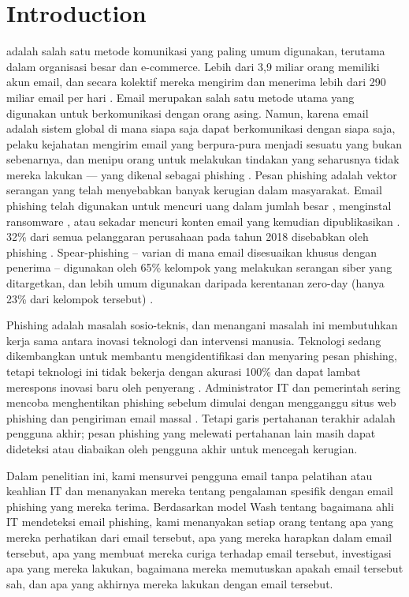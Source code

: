 \documentclass[lettersize,journal]{IEEEtran}
\begin{document}
\section{Introduction}
 adalah salah satu metode komunikasi yang paling umum
digunakan, terutama dalam organisasi besar dan e-commerce. Lebih dari 3,9 miliar
orang memiliki akun email, dan secara kolektif mereka mengirim dan menerima
lebih dari 290 miliar email per hari \cite{satusatu}. Email merupakan salah
satu metode utama yang digunakan untuk berkomunikasi dengan orang asing.
Namun, karena email adalah sistem global di mana siapa saja dapat berkomunikasi
dengan siapa saja, pelaku kejahatan mengirim email yang berpura-pura menjadi
sesuatu yang bukan sebenarnya, dan menipu orang untuk melakukan tindakan yang
seharusnya tidak mereka lakukan — yang dikenal sebagai phishing \cite{tigaempat}.
Pesan phishing adalah vektor serangan yang telah menyebabkan banyak kerugian
dalam masyarakat. Email phishing telah digunakan untuk mencuri uang dalam jumlah
besar \cite{duadua}, menginstal ransomware \cite{tigasatu}, atau sekadar mencuri
konten email yang kemudian dipublikasikan \cite{duasatu}. 32\% dari semua
pelanggaran perusahaan pada tahun 2018 disebabkan oleh phishing \cite{tigatiga}.
Spear-phishing – varian di mana email disesuaikan khusus dengan penerima – digunakan
oleh 65\% kelompok yang melakukan serangan siber yang ditargetkan, dan lebih umum
digunakan daripada kerentanan zero-day (hanya 23\% dari kelompok tersebut) \cite{tigadua}.

Phishing adalah masalah sosio-teknis, dan menangani masalah ini membutuhkan
kerja sama antara inovasi teknologi dan intervensi manusia. Teknologi sedang
dikembangkan untuk membantu mengidentifikasi dan menyaring pesan phishing,
tetapi teknologi ini tidak bekerja dengan akurasi 100\% dan dapat lambat
merespons inovasi baru oleh penyerang \cite{satuempat}. Administrator IT dan
pemerintah sering mencoba menghentikan phishing sebelum dimulai dengan
mengganggu situs web phishing dan pengiriman email massal \cite{satunol}.
Tetapi garis pertahanan terakhir adalah pengguna akhir; pesan phishing yang
melewati pertahanan lain masih dapat dideteksi atau diabaikan oleh pengguna
akhir untuk mencegah kerugian.

Dalam penelitian ini, kami mensurvei pengguna email tanpa pelatihan atau
keahlian IT dan menanyakan mereka tentang pengalaman spesifik dengan email
phishing yang mereka terima. Berdasarkan model Wash \cite{tigaempat} tentang
bagaimana ahli IT mendeteksi email phishing, kami menanyakan setiap orang
tentang apa yang mereka perhatikan dari email tersebut, apa yang mereka
harapkan dalam email tersebut, apa yang membuat mereka curiga terhadap email
tersebut, investigasi apa yang mereka lakukan, bagaimana mereka memutuskan
apakah email tersebut sah, dan apa yang akhirnya mereka lakukan dengan email
tersebut.
\end{document}
